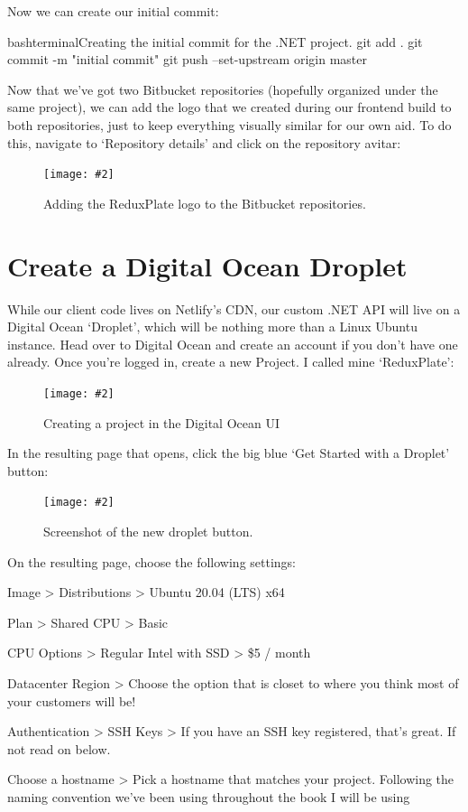 \documentclass[a4paper,headinclude=on,footinclude=on,12pt,oneside]{scrbook}
\newcommand{\standardfigure}[3]{\begin{figure}[H]\begin{center}\texttt{[image: \#2]}\caption{#3}\label{fig:#2}\end{center}\end{figure}}
\begin{document}
Now we can create our initial commit:

\begin{codeInput}{bash}{terminal}{Creating the initial commit for the .NET project.}
git add .
git commit -m "initial commit"
git push --set-upstream origin master
\end{codeInput}


Now that we've got two Bitbucket repositories (hopefully organized under the same project), we can add the logo that we created during our frontend build to both repositories, just to keep everything visually similar for our own aid. To do this, navigate to `Repository details' and click on the repository avitar:

\standardfigure{\textwidth}{backend/bitbucket/styling-repository-avatar}{Adding the ReduxPlate logo to the Bitbucket repositories.}

\section{Create a Digital Ocean Droplet}

While our client code lives on Netlify's CDN, our custom .NET API will live on a Digital Ocean `Droplet', which will be nothing more than a Linux Ubuntu instance. Head over to Digital Ocean and create an account if you don't have one already. Once you're logged in, create a new Project. I called mine `ReduxPlate':

\standardfigure{\textwidth}{backend/digital-ocean/create-project.png}{Creating a project in the Digital Ocean UI}

In the resulting page that opens, click the big blue `Get Started with a Droplet' button:

\standardfigure{\textwidth}{backend/digital-ocean/get-started-with-a-droplet}{Screenshot of the new droplet button.}

On the resulting page, choose the following settings:

\begin{arrows}
\item Image > Distributions > Ubuntu 20.04 (LTS) x64
\item Plan > Shared CPU > Basic
\item CPU Options > Regular Intel with SSD > \$5 / month
\item Datacenter Region > Choose the option that is closet to where you think most of your customers will be!
\item Authentication > SSH Keys > If you have an SSH key registered, that's great. If not read on below.
\item Choose a hostname > Pick a hostname that matches your project. Following the naming convention we've been using throughout the book I will be using 
\end{arrows}
\end{document}
